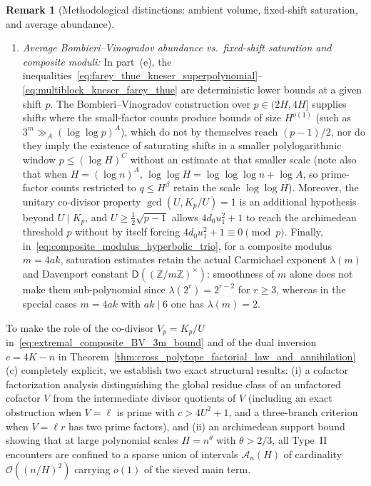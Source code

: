 \documentclass[11pt, a4paper]{article}
\theoremstyle{plain}
\theoremstyle{definition}
\newtheorem{remark}[theorem]{Remark}
\newcommand{\Z}{\mathbb{Z}}
\begin{document}
\begin{remark}[Methodological distinctions: ambient volume, fixed-shift saturation, and average abundance]
\begin{enumerate}[(1)]
    \item \emph{Average Bombieri--Vinogradov abundance vs.\ fixed-shift saturation and composite moduli:} In part~(e), the inequalities~\eqref{eq:farey_thue_kneser_superpolynomial}--\eqref{eq:multiblock_kneser_farey_thue} are deterministic lower bounds at a given shift $p$. The Bombieri--Vinogradov construction over $p\in(2H,4H]$ supplies shifts where the small-factor counts produce bounds of size $H^{o(1)}$ (such as $3^{m}\gg_A(\log\log p)^{A}$), which do not by themselves reach $(p-1)/2$, nor do they imply the existence of saturating shifts in a smaller polylogarithmic window $p\le(\log H)^{C}$ without an estimate at that smaller scale (note also that when $H=(\log n)^{A}$, $\log\log H=\log\log\log n+\log A$, so prime-factor counts restricted to $q\le H^{\beta}$ retain the scale $\log\log H$). Moreover, the unitary co-divisor property $\gcd(U,K_p/U)=1$ is an additional hypothesis beyond $U\mid K_p$, and $U\ge\frac12\sqrt{p-1}$ allows $4d_0u_1^{2}+1$ to reach the archimedean threshold $p$ without by itself forcing $4d_0u_1^{2}+1\equiv 0\pmod p$. Finally, in~\eqref{eq:composite_modulus_hyperbolic_trio}, for a composite modulus $m=4ak$, saturation estimates retain the actual Carmichael exponent $\lambda(m)$ and Davenport constant $\mathsf{D}((\Z/m\Z)^{\times})$: smoothness of $m$ alone does not make them sub-polynomial since $\lambda(2^{r})=2^{r-2}$ for $r\ge 3$, whereas in the special cases $m=4ak$ with $ak\mid 6$ one has $\lambda(m)=2$.
\end{enumerate}
\end{remark}

To make the role of the co-divisor $V_p=K_p/U$ in~\eqref{eq:extremal_composite_BV_3m_bound} and of the dual inversion $c=4K-n$ in Theorem~\ref{thm:cross_polytope_factorial_law_and_annihilation}(c) completely explicit, we establish two exact structural results: (i) a cofactor factorization analysis distinguishing the global residue class of an unfactored cofactor $V$ from the intermediate divisor quotients of $V$ (including an exact obstruction when $V=\ell$ is prime with $c>4U^{2}+1$, and a three-branch criterion when $V=\ell r$ has two prime factors), and (ii) an archimedean support bound showing that at large polynomial scales $H=n^{\theta}$ with $\theta>2/3$, all Type~II encounters are confined to a sparse union of intervals $\mathcal{A}_n(H)$ of cardinality $\mathcal{O}((n/H)^{2})$ carrying $o(1)$ of the sieved main term.
\end{document}
